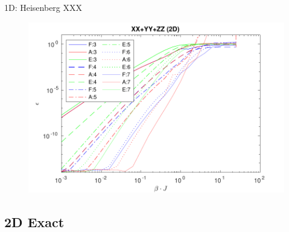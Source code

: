 \begin{frame}{1D: Heisenberg XXX}

    \begin{figure}
        \center
        \includegraphics[height=\textheight]{../Figuren/benchmarking/t_heis_XXX.pdf}
    \end{figure}

\end{frame}

\subsection{2D Exact}


